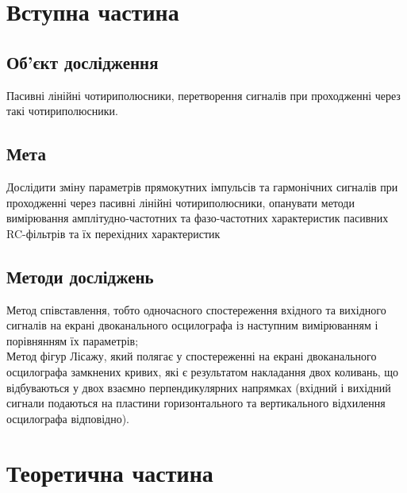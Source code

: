 \section{Вступна частина}
\subsection{Об'єкт дослідження}
\setlength{\parindent}{4em}
\indent Пасивні лінійні чотириполюсники, перетворення сигналів при проходженні через
такі чотириполюсники.
\subsection{Мета}
\indent Дослідити зміну параметрів прямокутних імпульсів та гармонічних сигналів при
проходженні через пасивні лінійні чотириполюсники, опанувати методи вимірювання
амплітудно-частотних та фазо-частотних характеристик пасивних RC-фільтрів та їх перехідних характеристик

\subsection{Методи досліджень}
\indent Метод співставлення, тобто одночасного спостереження вхідного та вихідного сигналів на екрані двоканального осцилографа із наступним вимірюванням і порівнянням
їх параметрів;\\
Метод фігур Лісажу, який полягає у спостереженні на екрані двоканального
осцилографа замкнених кривих, які є результатом накладання двох коливань, що відбуваються у двох взаємно перпендикулярних напрямках (вхідний і вихідний сигнали
подаються на пластини горизонтального та вертикального відхилення осцилографа відповідно).

\newpage
\section{Теоретична частина}
